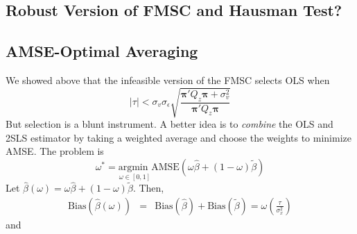\documentclass[12pt]{article}
\theoremstyle{definition}
\begin{document}
\subsection{Robust Version of FMSC and Hausman Test?} %
\label{sub:robust_version_of_fmsc_and_hausman_test_}





\subsection{AMSE-Optimal Averaging} %
\label{sub:amse_optimal_averaging}
We showed above that the infeasible version of the FMSC selects OLS when 
  $$|\tau|  < \sigma_v \sigma_\epsilon\sqrt{\frac{\boldsymbol{\pi}'Q_z \boldsymbol{\pi} + \sigma_v^2}{\boldsymbol{\pi}'Q_z \boldsymbol{\pi}}}$$
But selection is a blunt instrument. A better idea is to \emph{combine} the OLS and 2SLS estimator by taking a weighted average and choose the weights to minimize AMSE. The problem is 
  $$\omega^* = \underset{\omega \in [0,1]}{\mbox{argmin }} \mbox{AMSE}\left(\omega \widehat{\beta} + (1-\omega)\widetilde{\beta}\right)  $$
  Let $\widehat{\beta}(\omega) = \omega \widehat{\beta} + (1-\omega) \widetilde{\beta}$. Then,
    \begin{eqnarray*}
      \mbox{Bias}\left(\widehat{\beta}(\omega)\right) &=& \mbox{Bias}(\widehat{\beta}) + \mbox{Bias}(\widetilde{\beta})=\omega\left( \frac{\tau}{\sigma_x^2}\right)
    \end{eqnarray*}
  and
\end{document}
